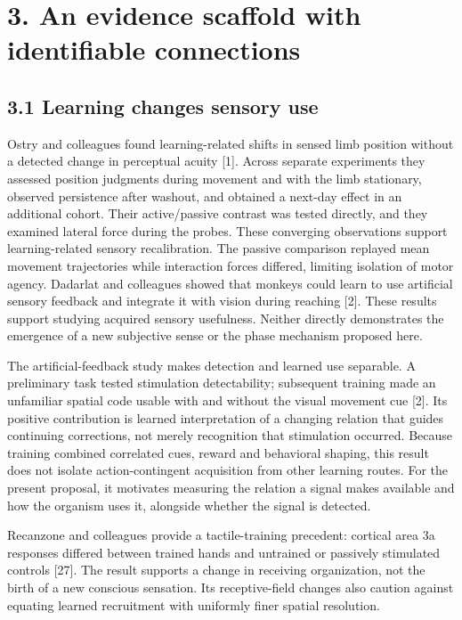 \documentclass[
  american,
  11pt,
  letterpaper,
]{article}
\begin{document}
\section{3. An evidence scaffold with identifiable connections}\label{an-evidence-scaffold-with-identifiable-connections}

\subsection{3.1 Learning changes sensory use}\label{learning-changes-sensory-use}

Ostry and colleagues found learning-related shifts in sensed limb position without a detected change in perceptual acuity {[}1{]}. Across separate experiments they assessed position judgments during movement and with the limb stationary, observed persistence after washout, and obtained a next-day effect in an additional cohort. Their active/passive contrast was tested directly, and they examined lateral force during the probes. These converging observations support learning-related sensory recalibration. The passive comparison replayed mean movement trajectories while interaction forces differed, limiting isolation of motor agency. Dadarlat and colleagues showed that monkeys could learn to use artificial sensory feedback and integrate it with vision during reaching {[}2{]}. These results support studying acquired sensory usefulness. Neither directly demonstrates the emergence of a new subjective sense or the phase mechanism proposed here.

The artificial-feedback study makes detection and learned use separable. A preliminary task tested stimulation detectability; subsequent training made an unfamiliar spatial code usable with and without the visual movement cue {[}2{]}. Its positive contribution is learned interpretation of a changing relation that guides continuing corrections, not merely recognition that stimulation occurred. Because training combined correlated cues, reward and behavioral shaping, this result does not isolate action-contingent acquisition from other learning routes. For the present proposal, it motivates measuring the relation a signal makes available and how the organism uses it, alongside whether the signal is detected.

Recanzone and colleagues provide a tactile-training precedent: cortical area 3a responses differed between trained hands and untrained or passively stimulated controls {[}27{]}. The result supports a change in receiving organization, not the birth of a new conscious sensation. Its receptive-field changes also caution against equating learned recruitment with uniformly finer spatial resolution.
\end{document}
